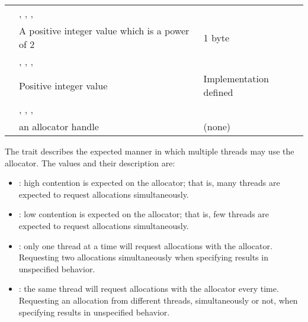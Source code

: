 \nolinenumbers
\renewcommand{\arraystretch}{1.5}
\tablelasttail{\hline}
\begin{supertabular}{p{1.2in}p{2.4in}p{1.2in}}
{} & {, , , } & {}\\
{} & A positive integer value which is a power of 2& 1 byte\\
{} & {, , , } & {}\\
{} & Positive integer value & Implementation defined\\
{} & {, , , } & {}\\
{} & an allocator handle & (none)\\
\end{supertabular}
\linenumbers

The {} trait describes the expected manner in which multiple threads may use the allocator. The values and their description are:
\begin{itemize}
 \item {}: high contention is expected on the allocator; that is, many threads are expected to request allocations simultaneously.
 \item {}: low contention is expected on the allocator; that is, few threads are expected to request allocations simultaneously.
 \item {}: only one thread at a time will request allocations with the allocator. Requesting two allocations simultaneously when specifying  results in unspecified behavior.
 \item {}: the same thread will request allocations with the allocator every time. Requesting an allocation from different threads, simultaneously or not, when specifying  results in unspecified behavior.
\end{itemize}

